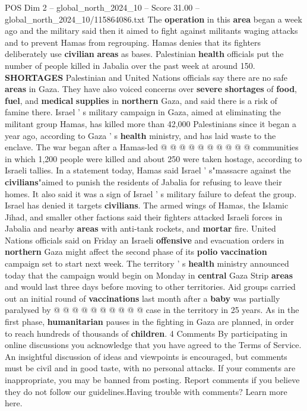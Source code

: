 \begin{textsample}{POS Dim 2 – global\_north\_2024\_10 – Score 31.00 – global\_north\_2024\_10/115864086.txt}
The \textbf{operation} in this \textbf{area} began a week ago and the military said then it aimed to fight against militants waging attacks and to prevent Hamas from regrouping.
Hamas denies that its fighters deliberately use \textbf{civilian} \textbf{areas} as bases.
Palestinian \textbf{health} officials put the number of people killed in Jabalia over the past week at around 150. \textbf{SHORTAGES} Palestinian and United Nations officials say there are no safe \textbf{areas} in Gaza.
They have also voiced concerns over \textbf{severe} \textbf{shortages} of \textbf{food}, \textbf{fuel}, and \textbf{medical} \textbf{supplies} in \textbf{northern} Gaza, and said there is a risk of famine there.
Israel ' s military campaign in Gaza, aimed at eliminating the militant group Hamas, has killed more than 42,000 Palestinians since it began a year ago, according to Gaza ' s \textbf{health} ministry, and has laid waste to the enclave.
The war began after a Hamas-led @ @ @ @ @ @ @ @ @ @ communities in which 1,200 people were killed and about 250 were taken hostage, according to Israeli tallies.
In a statement today, Hamas said Israel ' s"massacre against the \textbf{civilians}"aimed to punish the residents of Jabalia for refusing to leave their homes.
It also said it was a sign of Israel ' s military failure to defeat the group.
Israel has denied it targets \textbf{civilians}.
The armed wings of Hamas, the Islamic Jihad, and smaller other factions said their fighters attacked Israeli forces in Jabalia and nearby \textbf{areas} with anti-tank rockets, and \textbf{mortar} fire.
United Nations officials said on Friday an Israeli \textbf{offensive} and evacuation orders in \textbf{northern} Gaza might affect the second phase of its \textbf{polio} \textbf{vaccination} campaign set to start next week.
The territory ' s \textbf{health} ministry announced today that the campaign would begin on Monday in \textbf{central} Gaza Strip \textbf{areas} and would last three days before moving to other territories.
Aid groups carried out an initial round of \textbf{vaccinations} last month after a \textbf{baby} was partially paralysed by @ @ @ @ @ @ @ @ @ @ case in the territory in 25 years.
As in the first phase, \textbf{humanitarian} pauses in the fighting in Gaza are planned, in order to reach hundreds of thousands of \textbf{children}. 4 Comments By participating in online discussions you acknowledge that you have agreed to the Terms of Service.
An insightful discussion of ideas and viewpoints is encouraged, but comments must be civil and in good taste, with no personal attacks.
If your comments are inappropriate, you may be banned from posting.
Report comments if you believe they do not follow our guidelines.Having trouble with comments?
Learn more here.

\end{textsample}
